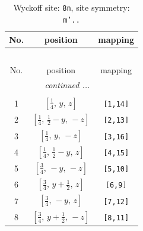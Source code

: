 \documentclass[fleqn,8pt]{jsarticle}
\begin{document}
\begin{longtable}{ccc}
\caption{Wyckoff site: {\tt 8n}, site symmetry: {\tt m'..}}
 \\
 \hline \hline
No. & position & mapping \\ \hline \endfirsthead

\multicolumn{2}{l}{\tablename\ \thetable{}} \\
 \hline \hline
No. & position & mapping \\ \hline \endhead

 \hline \hline
\multicolumn{2}{r}{\footnotesize\it continued ...} \\ \endfoot

 \hline \hline
\multicolumn{2}{r}{} \\ \endlastfoot

1 & $\left[ \frac{1}{4},\, y,\, z \right]$ & {\tt [1,14]} \\ \hline
2 & $\left[ \frac{1}{4},\, \frac{1}{2} - y,\, - z \right]$ & {\tt [2,13]} \\ \hline
3 & $\left[ \frac{1}{4},\, y,\, - z \right]$ & {\tt [3,16]} \\ \hline
4 & $\left[ \frac{1}{4},\, \frac{1}{2} - y,\, z \right]$ & {\tt [4,15]} \\ \hline
5 & $\left[ \frac{3}{4},\, - y,\, - z \right]$ & {\tt [5,10]} \\ \hline
6 & $\left[ \frac{3}{4},\, y + \frac{1}{2},\, z \right]$ & {\tt [6,9]} \\ \hline
7 & $\left[ \frac{3}{4},\, - y,\, z \right]$ & {\tt [7,12]} \\ \hline
8 & $\left[ \frac{3}{4},\, y + \frac{1}{2},\, - z \right]$ & {\tt [8,11]} \\
\end{longtable}
\renewcommand{\arraystretch}{1.2}
\end{document}
